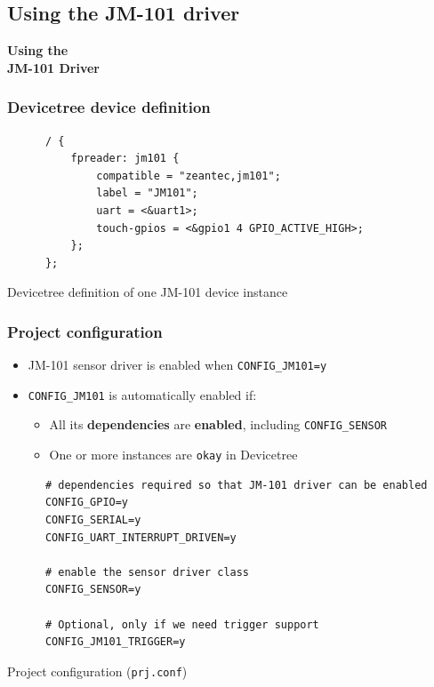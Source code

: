 \documentclass[handout]{beamer}
\begin{document}
\subsection{Using the JM-101 driver}

\begin{frame}
  \begin{center}
    \Large \textbf{Using the\\JM-101 Driver}
  \end{center}
\end{frame}

\begin{frame}[fragile]
  \frametitle{Devicetree device definition}

  \begin{listing}[H]
    \begin{verbatim}
      / {
          fpreader: jm101 {
              compatible = "zeantec,jm101";
              label = "JM101";
              uart = <&uart1>;
              touch-gpios = <&gpio1 4 GPIO_ACTIVE_HIGH>;
          };
      };
    \end{verbatim}
    \caption{Devicetree definition of one JM-101 device instance}
  \end{listing}
\end{frame}

\begin{frame}[fragile]
  \frametitle{Project configuration}

  \begin{itemize}
    \item JM-101 sensor driver is enabled when \texttt{CONFIG\_JM101=y}
    \item \texttt{CONFIG\_JM101} is automatically enabled if:
          \begin{itemize}
            \item All its \textbf{dependencies} are \textbf{enabled}, including
                  \texttt{CONFIG\_SENSOR}
            \item One or more instances are \texttt{okay} in Devicetree
          \end{itemize}
  \end{itemize}
  \begin{listing}[H]
    \begin{verbatim}
      # dependencies required so that JM-101 driver can be enabled
      CONFIG_GPIO=y
      CONFIG_SERIAL=y
      CONFIG_UART_INTERRUPT_DRIVEN=y

      # enable the sensor driver class
      CONFIG_SENSOR=y

      # Optional, only if we need trigger support
      CONFIG_JM101_TRIGGER=y
    \end{verbatim}
    \caption{Project configuration (\texttt{prj.conf})}
  \end{listing}
\end{frame}
\end{document}
